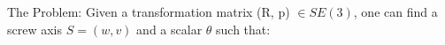 \documentclass[preview]{standalone}
\begin{document}
\begin{center}
The Problem: Given a transformation matrix (R, p) $\in SE(3)$, one can find a screw axis $S=(w,v)$ and a scalar $\theta$ such that:
\end{center}
\end{document}
